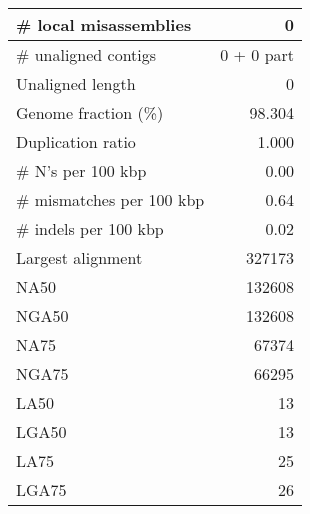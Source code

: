 \documentclass[12pt,a4paper]{article}
\begin{document}
\begin{table}[ht]
\begin{center}
\begin{tabular}{|l*{1}{|r}|}
\# local misassemblies & 0 \\ \hline
\# unaligned contigs & 0 + 0 part \\ \hline
Unaligned length & 0 \\ \hline
Genome fraction (\%) & 98.304 \\ \hline
Duplication ratio & 1.000 \\ \hline
\# N's per 100 kbp & 0.00 \\ \hline
\# mismatches per 100 kbp & 0.64 \\ \hline
\# indels per 100 kbp & 0.02 \\ \hline
Largest alignment & 327173 \\ \hline
NA50 & 132608 \\ \hline
NGA50 & 132608 \\ \hline
NA75 & 67374 \\ \hline
NGA75 & 66295 \\ \hline
LA50 & 13 \\ \hline
LGA50 & 13 \\ \hline
LA75 & 25 \\ \hline
LGA75 & 26 \\ \hline
\end{tabular}
\end{center}
\end{table}
\end{document}
